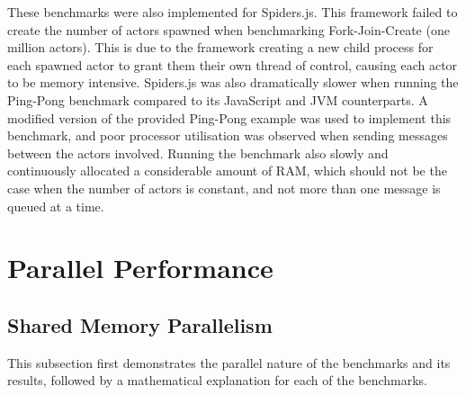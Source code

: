 \documentclass[oneside]{um-fict}
\begin{document}
These benchmarks were also implemented for Spiders.js. This framework failed to create the number of actors spawned when benchmarking Fork-Join-Create (one million actors). This is due to the framework creating a new child process for each spawned actor to grant them their own thread of control, causing each actor to be memory intensive. Spiders.js was also dramatically slower when running the Ping-Pong benchmark compared to its JavaScript and JVM counterparts. A modified version of the provided Ping-Pong example was used to implement this benchmark, and poor processor utilisation was observed when sending messages between the actors involved. Running the benchmark also slowly and continuously allocated a considerable amount of RAM, which should not be the case when the number of actors is constant, and not more than one message is queued at a time.
\section{Parallel Performance}\label{section:parallel}
\subsection{Shared Memory Parallelism}
This subsection first demonstrates the parallel nature of the benchmarks and its results, followed by a mathematical explanation for each of the benchmarks.
\end{document}
